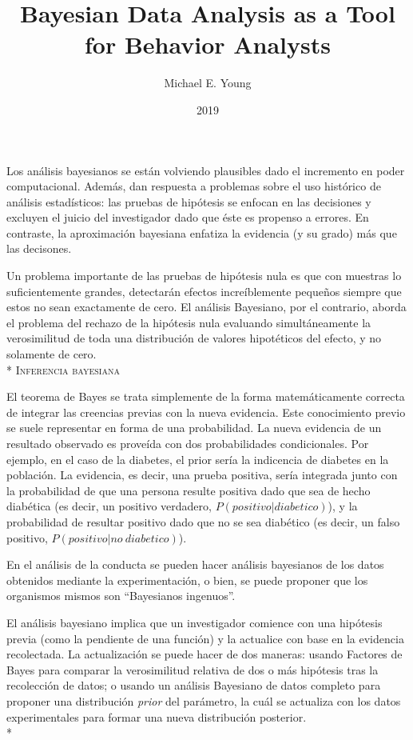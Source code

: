 \documentclass[a4paper,12pt]{article}
\title{Bayesian Data Analysis as a Tool for Behavior Analysts}
\author{Michael E. Young}
\date{2019}
\begin{document}
{\scshape\bfseries \maketitle}

Los análisis bayesianos se están volviendo plausibles dado el incremento en poder computacional. Además, dan respuesta a problemas sobre el uso histórico de análisis estadísticos: las pruebas de hipótesis se enfocan en las decisiones y excluyen el juicio del investigador dado que éste es propenso a errores. En contraste, la aproximación bayesiana enfatiza la evidencia (y su grado) más que las decisones.

Un problema importante de las pruebas de hipótesis nula es que con muestras lo suficientemente grandes, detectarán efectos increíblemente pequeños siempre que estos no sean exactamente de cero. El análisis Bayesiano, por el contrario, aborda el problema del rechazo de la hipótesis nula evaluando simultáneamente la verosimilitud de toda una distribución de valores hipotéticos del efecto, y no solamente de cero.
\\*
{\scshape Inferencia bayesiana}

El teorema de Bayes se trata simplemente de la forma matemáticamente correcta de integrar las creencias previas con la nueva evidencia. Este conocimiento previo se suele representar en forma de una probabilidad. La nueva evidencia de un resultado observado es proveída con dos probabilidades condicionales. Por ejemplo, en el caso de la diabetes, el prior sería la indicencia de diabetes en la población. La evidencia, es decir, una prueba positiva, sería integrada junto con la probabilidad de que una persona resulte positiva dado que sea de hecho diabética (es decir, un positivo verdadero, $P(positivo|diabetico)$), y la probabilidad de resultar positivo dado que no se sea diabético (es decir, un falso positivo, $P(positivo|no\ diabetico)$).

En el análisis de la conducta se pueden hacer análisis bayesianos de los datos obtenidos mediante la experimentación, o bien, se puede proponer que los organismos mismos son ``Bayesianos ingenuos''.

El análisis bayesiano implica que un investigador comience con una hipótesis previa (como la pendiente de una función) y la actualice con base en la evidencia recolectada. La actualización se puede hacer de dos maneras: usando Factores de Bayes para comparar la verosimilitud relativa de dos o más hipótesis tras la recolección de datos; o usando un análisis Bayesiano de datos completo para proponer una distribución {\slshape prior} del parámetro, la cuál se actualiza con los datos experimentales para formar una nueva distribución posterior.
\\*
\end{document}
